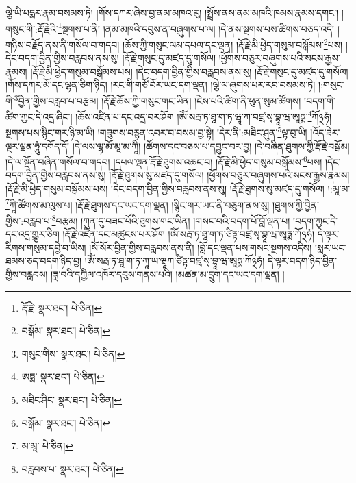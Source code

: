 ལྕེ་ཡི་པདྨར་རྣམ་བསམས་ཏེ། །གོས་དཀར་ཞེས་བྱ་ནམ་མཁའ་རུ། །སྤྲོས་ནས་ནམ་མཁའི་ཁམས་རྣམས་དགང་། །གསུང་གི་:རྡོ་རྗེའི་\footnote{རྡོ་རྗེ་  སྣར་ཐང་།  པེ་ཅིན། }སྔགས་པ་ནི། །ནམ་མཁའི་དབུས་ན་བཞུགས་པ་ལ། །དེ་ནས་སྔགས་པས་ཚིགས་བཅད་འདི། །གཉིས་བརྗོད་ནས་ནི་གསོལ་བ་གདབ། །ཆོས་ཀྱི་གསུང་ལམ་དཔལ་དང་ལྡན། །རྡོ་རྗེ་མི་ཕྱེད་གསུམ་བསྒོམས་\footnote{བསྒོམ་  སྣར་ཐང་།  པེ་ཅིན། }པས། །དེང་བདག་བྱིན་གྱིས་བརླབས་ནས་སུ། །རྡོ་རྗེ་གསུང་དུ་མཛད་དུ་གསོལ། །ཕྱོགས་བཅུར་བཞུགས་པའི་སངས་རྒྱས་རྣམས། །རྡོ་རྗེ་མི་ཕྱེད་གསུམ་བསྒོམས་པས། །དེང་བདག་བྱིན་གྱིས་བརླབས་ནས་སུ། །རྡོ་རྗེ་གསུང་དུ་མཛད་དུ་གསོལ། །གོས་དཀར་མོ་དང་ལྷན་ཅིག་ཉིད། །རང་གི་གཙོ་བོར་ཡང་དག་ལྡན། །ལྕེ་ལ་ཞུགས་པར་རབ་བསམས་ཏེ། །:གསུང་གི་\footnote{གསུང་གིས་  སྣར་ཐང་།  པེ་ཅིན། }བྱིན་གྱིས་བརླབ་པ་བརྩམ། །རྡོ་རྗེ་ཆོས་ཀྱི་གསུང་གང་ཡིན། །ངེས་པའི་ཚིག་ནི་ཕུན་སུམ་ཚོགས། །བདག་གི་ཚིག་ཀྱང་དེ་འདྲ་ཞིང་། །ཆོས་འཛིན་པ་དང་འདྲ་བར་ཤོག །ཨོཾ་སརྦ་ཏ་ཐཱ་ག་ཏ་ཝཱ་ཀ་བཛྲ་སྭ་བྷཱ་ཝ་ཨཱཏྨ་\footnote{ཨཏྨ་  སྣར་ཐང་།  པེ་ཅིན། }ཀོ྅ཧཾ། སྔགས་པས་སྙིང་གར་ཉི་མ་ཡི། །གཟུགས་བརྙན་འབར་བ་བསམ་བྱ་སྟེ། །དེར་ནི་:མཐིང་ཤུན་\footnote{མཐིང་ཤིང་  སྣར་ཐང་།  པེ་ཅིན། }ལྟ་བུ་ཡི། །འོད་ཟེར་ལྔར་ལྡན་ཧཱུཾ་དགོད་དོ། །དེ་ལས་ལྷ་མོ་མཱ་མ་ཀཱི། །ཚོགས་དང་བཅས་པ་དབྱུང་བར་བྱ། །དེ་བཞིན་ཐུགས་ཀྱི་རྡོ་རྗེ་བསྒོམ། །དེ་ལ་སྔོན་བཞིན་གསོལ་བ་གདབ། །དཔལ་ལྡན་རྡོ་རྗེ་ཐུགས་འཆང་བ། །རྡོ་རྗེ་མི་ཕྱེད་གསུམ་བསྒོམས་\footnote{བསྒོམ་  སྣར་ཐང་།  པེ་ཅིན། }པས། །དེང་བདག་བྱིན་གྱིས་བརླབས་ནས་སུ། །རྡོ་རྗེ་ཐུགས་སུ་མཛད་དུ་གསོལ། །ཕྱོགས་བཅུར་བཞུགས་པའི་སངས་རྒྱས་རྣམས། །རྡོ་རྗེ་མི་ཕྱེད་གསུམ་བསྒོམས་པས། །དེང་བདག་བྱིན་གྱིས་བརླབས་ནས་སུ། །རྡོ་རྗེ་ཐུགས་སུ་མཛད་དུ་གསོལ། །:མཱ་མ་\footnote{མ་མཱ་  པེ་ཅིན། }ཀཱི་ཚོགས་མ་ལུས་པ། །རྡོ་རྗེ་ཐུགས་དང་ཡང་དག་ལྡན། །སྙིང་གར་ཡང་ནི་བཅུག་ནས་སུ། །ཐུགས་ཀྱི་བྱིན་གྱིས་:བརླབ་པ་\footnote{བརླབས་པ་  སྣར་ཐང་།  པེ་ཅིན། }བརྩམ། །ཀུན་དུ་བཟང་པོའི་ཐུགས་གང་ཡིན། །གསང་བའི་བདག་པོ་བློ་ལྡན་པ། །བདག་ཀྱང་དེ་དང་འདྲ་གྱུར་ཅིག །རྡོ་རྗེ་འཛིན་དང་མཚུངས་པར་ཤོག །ཨོཾ་སརྦ་ཏ་ཐཱ་ག་ཏ་ཙིཏྟ་བཛྲ་སྭ་བྷཱ་ཝ་ཨཱཏྨ་ཀོ྅ཧཾ། དེ་ལྟར་རིགས་གསུམ་དབྱེ་བ་ཡིས། །སོ་སོར་བྱིན་གྱིས་བརླབས་ནས་ནི། །བློ་དང་ལྡན་པས་གསང་སྔགས་འདིས། །སླར་ཡང་ཐམས་ཅད་བདག་ཉིད་བྱ། །ཨོཾ་སརྦ་ཏ་ཐཱ་ག་ཏ་ཀཱ་ཡ་ཝཱཀ་ཙིཏྟ་བཛྲ་སྭ་བྷཱ་ཝ་ཨཱཏྨ་ཀོ྅ཧཾ། དེ་ལྟར་བདག་ཉིད་བྱིན་གྱིས་བརླབས། །ཟླ་བའི་དཀྱིལ་འཁོར་དབུས་གནས་པའི། །མཚན་མ་དྲུག་དང་ཡང་དག་ལྡན། །
